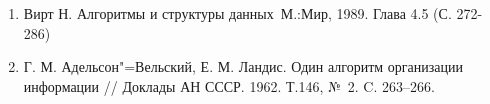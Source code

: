 \begin{enumerate}
    \item Вирт Н. Алгоритмы и структуры данных М.:Мир, 1989. Глава 4.5 (С. 272-286)
    \item Г. М. Адельсон"=Вельский, Е. М. Ландис. Один алгоритм организации информации // Доклады АН СССР. 1962. Т.146, № 2. C. 263–266.
\end{enumerate}